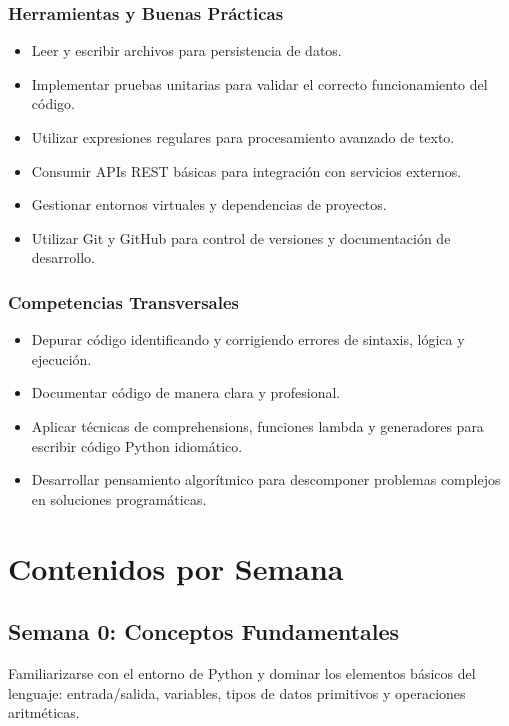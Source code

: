 \documentclass[12pt,letterpaper]{article}
\begin{document}
\subsubsection{Herramientas y Buenas Prácticas}
\begin{itemize}[leftmargin=*]
    \item Leer y escribir archivos para persistencia de datos.
    \item Implementar pruebas unitarias para validar el correcto funcionamiento del código.
    \item Utilizar expresiones regulares para procesamiento avanzado de texto.
    \item Consumir APIs REST básicas para integración con servicios externos.
    \item Gestionar entornos virtuales y dependencias de proyectos.
    \item Utilizar Git y GitHub para control de versiones y documentación de desarrollo.
\end{itemize}

\subsubsection{Competencias Transversales}
\begin{itemize}[leftmargin=*]
    \item Depurar código identificando y corrigiendo errores de sintaxis, lógica y ejecución.
    \item Documentar código de manera clara y profesional.
    \item Aplicar técnicas de comprehensions, funciones lambda y generadores para escribir código Python idiomático.
    \item Desarrollar pensamiento algorítmico para descomponer problemas complejos en soluciones programáticas.
\end{itemize}

\newpage

\section{Contenidos por Semana}

\subsection{Semana 0: Conceptos Fundamentales}

\begin{objetivobox}
Familiarizarse con el entorno de Python y dominar los elementos básicos del lenguaje: entrada/salida, variables, tipos de datos primitivos y operaciones aritméticas.
\end{objetivobox}
\end{document}
